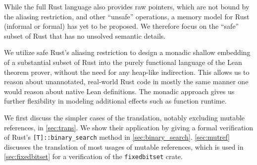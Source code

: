 While the full Rust language also provides raw pointers, which are not bound by
the aliasing restriction, and other ``unsafe'' operations, a
memory model for Rust (informal or formal) has yet to be proposed. We therefore focus on the ``safe''
subset of Rust that has no unsolved semantic details.

We utilize safe Rust's aliasing restriction to design a monadic shallow embedding of a
substantial subset of Rust
into the purely functional language of the Lean~\cite{de2015lean} theorem prover, without the need
for any heap-like indirection. This allows us to
reason about unannotated, real-world Rust code in mostly the same manner one would
reason about native Lean definitions. The monadic approach gives us further
flexibility in modeling additional effects such as function runtime.

We first discuss the simpler cases of the
translation, notably excluding mutable references, in \autoref{sec:trans}. We
show their application by giving a formal verification of Rust's
\verb![T]::binary_search! method in \autoref{sec:binary_search}.
\autoref{sec:mutref} discusses the translation of most usages of mutable
references, which is used in \autoref{sec:fixedbitset} for a verification of the
\texttt{fixedbitset} crate.